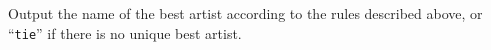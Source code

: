 
    Output the name of the best artist according to the rules described above, or ``\texttt{tie}'' if there is no unique best artist.
